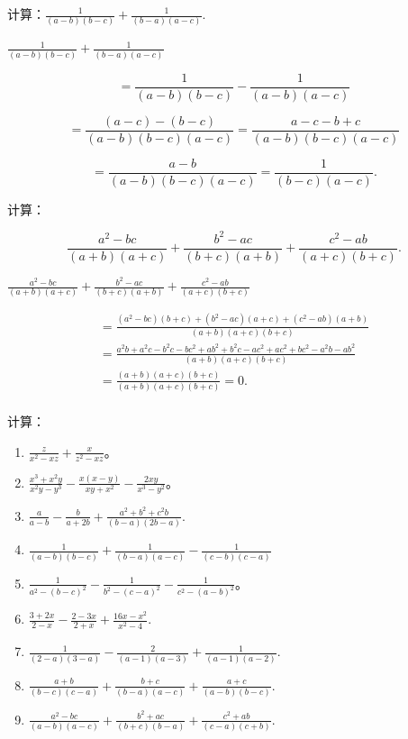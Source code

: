 计算：\(\frac{1}{(a - b)(b - c)} +\frac{1}{(b - a)(a - c)}.\)

\(\frac{1}{(a - b)(b - c)} +\frac{1}{(b - a)(a - c)}\)

\[
= \frac{1}{(a - b) (b - c)} - \frac{1}{(a - b) (a - c)}
\]

\[
= \frac{(a - c) - (b - c)}{(a - b) (b - c) (a - c)} = \frac{a - c - b + c}{(a - b) (b - c) (a - c)}
\]

\[
= \frac{a - b}{(a - b) (b - c) (a - c)} = \frac{1}{(b - c) (a - c)}.
\]

 计算：

\[
\frac{a ^{2} - b c}{(a + b) (a + c)} + \frac{b ^{2} - a c}{(b + c) (a + b)} + \frac{c ^{2} - a b}{(a + c) (b + c)}.
\]

\(\frac{a^2 - bc}{(a + b)(a + c)} + \frac{b^2 - ac}{(b + c)(a + b)} + \frac{c^2 - ab}{(a + c)(b + c)}\)

\[
\begin{array}{l} = \frac{(a ^{2} - b c) (b + c) + (b ^{2} - a c) (a + c) + (c ^{2} - a b) (a + b)}{(a + b) (a + c) (b + c)} \\ = \frac{a ^{2} b + a ^{2} c - b ^{2} c - b c ^{2} + a b ^{2} + b ^{2} c - a c ^{2} + a c ^{2} + b c ^{2} - a ^{2} b - a b ^{2}}{(a + b) (a + c) (b + c)} \\ = \frac{(a + b) (a + c) (b + c)}{(a + b) (a + c) (b + c)} = 0. \\ \end{array}
\]

计算：

\begin{enumerate}[start=1]
\item
  \(\frac{z}{x^2 - xz} + \frac{x}{z^2 - xz}\)。
\item
  \(\frac{x^3 + x^2y}{x^2y - y^3} - \frac{x(x - y)}{xy + x^2} - \frac{2xy}{x^3 - y^2}\)。
\item
  \(\frac{a}{a - b} -\frac{b}{a + 2b} +\frac{a^2 + b^2 + c^2b}{(b - a)(2b - a)}.\)
\item
  \(\frac{1}{(a - b)(b - c)} + \frac{1}{(b - a)(a - c)} - \frac{1}{(c - b)(c - a)}\)
\item
  \(\frac{1}{a^2 - (b - c)^2} - \frac{1}{b^2 - (c - a)^2} - \frac{1}{c^2 - (a - b)^2}\)。
\item
  \(\frac{3 + 2x}{2 - x} -\frac{2 - 3x}{2 + x} +\frac{16x - x^2}{x^2 - 4}.\)
\item
  \(\frac{1}{(2 - a)(3 - a)} - \frac{2}{(a - 1)(a - 3)} + \frac{1}{(a - 1)(a - 2)}.\)
\item
  \(\frac{a + b}{(b - c)(c - a)} + \frac{b + c}{(b - a)(a - c)} + \frac{a + c}{(a - b)(b - c)}.\)
\item
  \(\frac{a^2 - bc}{(a - b)(a - c)} + \frac{b^2 + ac}{(b + c)(b - a)} + \frac{c^2 + ab}{(c - a)(c + b)}.\)
\end{enumerate}

